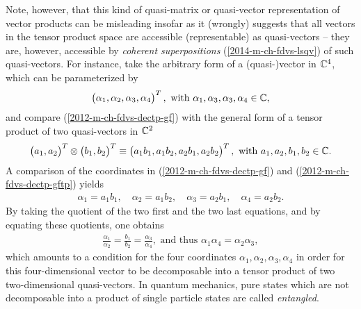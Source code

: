 Note, however, that this kind of quasi-matrix or quasi-vector representation of vector products
can be misleading insofar as
it (wrongly) suggests that all vectors in the tensor product space are accessible (representable) as quasi-vectors
-- they are, however, accessible by {\em coherent superpositions} (\ref{2014-m-ch-fdvs-lsqv})
of such quasi-vectors. \label{2012-m-c-fdvs-entanglement}
For instance, take the arbitrary form of a (quasi-)vector in ${\Bbb C}^4$, which can be parameterized by
\begin{equation}
\begin{pmatrix}\alpha_1,\alpha_2,\alpha_3,\alpha_4\end{pmatrix}^T, \textrm{ with } \alpha_1,\alpha_3,\alpha_3,\alpha_4 \in {\Bbb C},
\label{2012-m-ch-fdvs-dectp-gf}
\end{equation}
and compare (\ref{2012-m-ch-fdvs-dectp-gf}) with the general form of a tensor product of two quasi-vectors in  ${\Bbb C}^2$
\begin{equation}
\begin{pmatrix}a_1,a_2\end{pmatrix}^T\otimes \begin{pmatrix}b_1,b_2\end{pmatrix}^T
\equiv \begin{pmatrix}a_1b_1, a_1 b_2,a_2b_1,a_2b_2\end{pmatrix}^T, \textrm{ with } a_1,a_2,b_1,b_2\in {\Bbb C}.
\label{2012-m-ch-fdvs-dectp-gftp}
\end{equation}
A comparison of the coordinates in
(\ref{2012-m-ch-fdvs-dectp-gf})
and
(\ref{2012-m-ch-fdvs-dectp-gftp})
yields
\begin{equation}
\begin{split}
\alpha_1=a_1b_1,\quad
\alpha_2=a_1b_2,\quad
\alpha_3=a_2b_1,\quad
\alpha_4=a_2b_2.
\end{split}
\label{2012-m-ch-fdvs-dectp-gftp-a}
\end{equation}
By taking the quotient of the two first and the two last equations, and by equating these quotients, one obtains
\begin{equation}
\begin{split}
\frac{\alpha_1}{\alpha_2}=\frac{b_1}{b_2}
=\frac{\alpha_3}{\alpha_4},\textrm{ and thus }
{\alpha_1}{\alpha_4}={\alpha_2}{\alpha_3},
\end{split}
\label{2012-m-ch-fdvs-dectp-gftp-fr}
\end{equation}
which amounts to a condition for the four coordinates  $\alpha_1,\alpha_2,\alpha_3,\alpha_4$
in order for this four-dimensional vector to be decomposable into a tensor product of two two-dimensional quasi-vectors.
In quantum mechanics, pure states which are not decomposable into a  product of single particle states
are called {\em entangled}.


